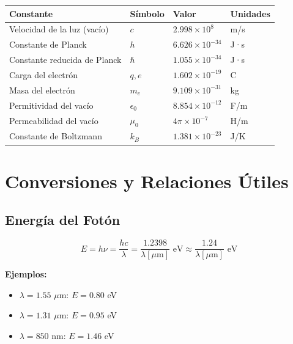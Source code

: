 \documentclass[11pt,a4paper]{article}
\begin{document}
\begin{table}[h]
\centering
\begin{tabular}{llll}
\hline
\textbf{Constante} & \textbf{Símbolo} & \textbf{Valor} & \textbf{Unidades} \\
\hline
Velocidad de la luz (vacío) & $c$ & $2.998 \times 10^8$ & m/s \\
Constante de Planck & $h$ & $6.626 \times 10^{-34}$ & J·s \\
Constante reducida de Planck & $\hbar$ & $1.055 \times 10^{-34}$ & J·s \\
Carga del electrón & $q, e$ & $1.602 \times 10^{-19}$ & C \\
Masa del electrón & $m_e$ & $9.109 \times 10^{-31}$ & kg \\
Permitividad del vacío & $\epsilon_0$ & $8.854 \times 10^{-12}$ & F/m \\
Permeabilidad del vacío & $\mu_0$ & $4\pi \times 10^{-7}$ & H/m \\
Constante de Boltzmann & $k_B$ & $1.381 \times 10^{-23}$ & J/K \\
\hline
\end{tabular}
\end{table}

\section{Conversiones y Relaciones Útiles}

\subsection{Energía del Fotón}

\begin{equation}
    E = h\nu = \frac{hc}{\lambda} = \frac{1.2398}{\lambda[\mu\text{m}]} \text{ eV} \approx \frac{1.24}{\lambda[\mu\text{m}]} \text{ eV}
\end{equation}

\textbf{Ejemplos:}
\begin{itemize}
    \item $\lambda = 1.55$ $\mu$m: $E = 0.80$ eV
    \item $\lambda = 1.31$ $\mu$m: $E = 0.95$ eV
    \item $\lambda = 850$ nm: $E = 1.46$ eV
\end{itemize}
\end{document}

